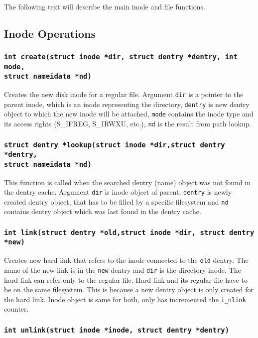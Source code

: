 The following text will describe the main inode and file functions.


\subsection{Inode Operations}
\subsubsection{\texttt{int create(struct inode *dir, struct dentry *dentry, int mode,
\\ struct nameidata *nd)}}

Creates the new disk inode for a regular file. Argument \texttt{dir} is a pointer to the
parent inode, which is an inode representing the directory, \texttt{dentry} is new dentry
object to which the new inode will be attached, \texttt{mode} contains the inode type
and its access rights (S\_IFREG, S\_IRWXU, etc.), \texttt{nd} is the result from path lookup.

\subsubsection{\texttt{struct dentry *lookup(struct inode *dir,struct dentry
*dentry,\\ struct nameidata *nd)}}

This function is called when the searched dentry (name) object was not found in the dentry
cache. Argument \texttt{dir} is inode object of parent, \texttt{dentry} is newly created
dentry object, that has to be filled by a specific filesystem and \texttt{nd} contains
dentry object which was last found in the dentry cache.

\subsubsection{\texttt{int link(struct dentry *old,struct inode *dir, struct dentry
*new)}}

Creates new hard link that refers to the inode connected to the \texttt{old} dentry.
The name of the new link is in the \texttt{new} dentry and \texttt{dir} is the
directory inode. The hard
link can refer only to the regular file. Hard link and its regular file have to be on the
same filesystem. This is because a new dentry object is only created for the hard
link. Inode object is same for both, only has incremented the \texttt{i\_nlink} counter.

\subsubsection{\texttt{int unlink(struct inode *inode, struct dentry *dentry)}}

